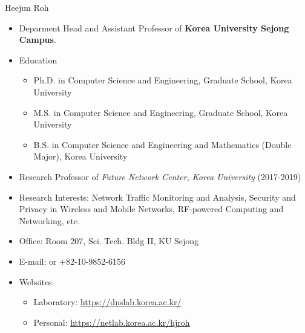 \begin{frame}{Heejun Roh}
  \begin{itemize}
  \item Deparment Head and Assistant Professor of {\bf Korea University Sejong Campus}.
  \item Education
  \begin{itemize}
    \item Ph.D. in Computer Science and Engineering, Graduate School, Korea University
    \item M.S. in Computer Science and Engineering, Graduate School, Korea University
    \item B.S. in Computer Science and Engineering and Mathematics (Double Major), Korea University
  \end{itemize}
  \item Research Professor of {\em Future Network Center, Korea University} (2017-2019)
  \item Research Interests: Network Traffic Monitoring and Analysis, Security and Privacy in Wireless and Mobile Networks, RF-powered Computing and Networking, etc.
  \item Office: Room 207, Sci. Tech. Bldg II, KU Sejong
  \item E-mail:  or +82-10-9852-6156
  \item Websites:
  \begin{itemize}
    \item Laboratory: \url{https://dnslab.korea.ac.kr/}
    \item Personal: \url{https://netlab.korea.ac.kr/hjroh}
  \end{itemize}
  \end{itemize}
\end{frame}

